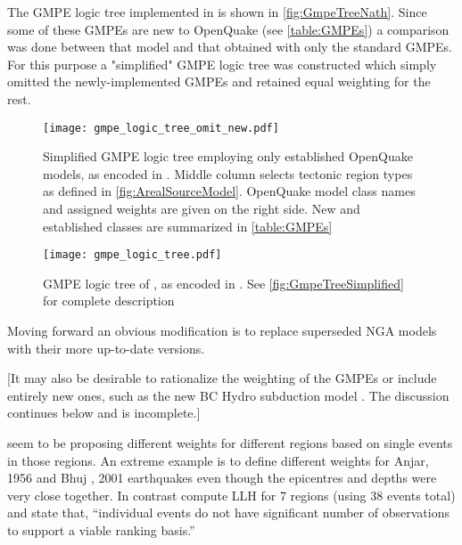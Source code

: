 \documentclass{article}
\begin{document}
The GMPE logic tree implemented in \cite{nath2012probabilistic} is shown in \autoref{fig:GmpeTreeNath}.
Since some of these GMPEs are new to OpenQuake (see \autoref{table:GMPEs}) a comparison was done between that model and that obtained with only the standard GMPEs.
For this purpose a "simplified" GMPE logic tree was constructed which simply omitted the newly-implemented GMPEs and retained equal weighting for the rest.

\begin{figure}[!htb]
\begin{adjustbox}{center}
\texttt{[image: gmpe\_logic\_tree\_omit\_new.pdf]}
\end{adjustbox}
\caption[Simplified GMPE logic tree]{Simplified GMPE logic tree employing only established OpenQuake models, as encoded in \texttt{}.
Middle column selects tectonic region types as defined in \autoref{fig:ArealSourceModel}.
OpenQuake model class names and assigned weights are given on the right side.
New and established classes are summarized in \autoref{table:GMPEs}}
\label{fig:GmpeTreeSimplified}
\end{figure}

\begin{figure}
\begin{adjustbox}{center}
\texttt{[image: gmpe\_logic\_tree.pdf]}
\end{adjustbox}
\caption[Original GMPE logic tree]{GMPE logic tree of \cite{nath2012probabilistic}, as encoded in \texttt{}.
See \autoref{fig:GmpeTreeSimplified} for complete description}
\label{fig:GmpeTreeNath}
\end{figure}

Moving forward an obvious modification is to replace superseded NGA models with their more up-to-date versions.

[It may also be desirable to rationalize the weighting of the GMPEs or include entirely new ones, such as the new BC Hydro subduction model \citep{abrahamson2012bc}.
The discussion continues below and is incomplete.]

\cite{anbazhagan2015selection} seem to be proposing different weights for different regions based on single events in those regions.
An extreme example is to define different weights for Anjar, 1956 and Bhuj , 2001 earthquakes even though the epicentres and depths were very close together.
In contrast \cite{nath2011peak} compute LLH for 7 regions (using 38 events total) and state that, ``individual events do not have significant number of observations to support a viable ranking basis.''
\end{document}
